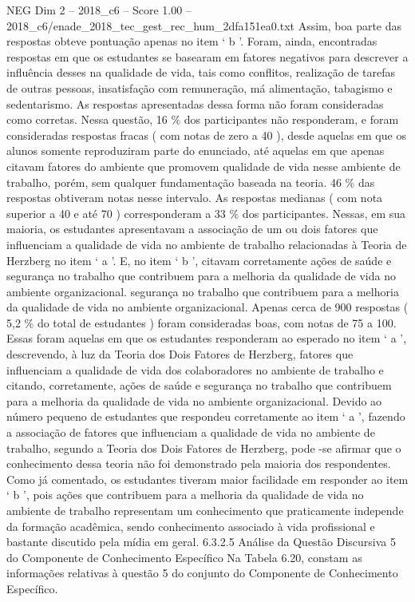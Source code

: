 \begin{textsample}{NEG Dim 2 – 2018\_c6 – Score 1.00 – 2018\_c6/enade\_2018\_tec\_gest\_rec\_hum\_2dfa151ea0.txt}
Assim, boa parte das respostas obteve pontuação apenas no item ‘ b ’.
Foram, ainda, encontradas respostas em que os estudantes se basearam em fatores negativos para descrever a influência desses na qualidade de vida, tais como conflitos, realização de tarefas de outras pessoas, insatisfação com remuneração, má alimentação, tabagismo e sedentarismo.
As respostas apresentadas dessa forma não foram consideradas como corretas.
Nessa questão, 16 \% dos participantes não responderam, e foram consideradas respostas fracas ( com notas de zero a 40 ), desde aquelas em que os alunos somente reproduziram parte do enunciado, até aquelas em que apenas citavam fatores do ambiente que promovem qualidade de vida nesse ambiente de trabalho, porém, sem qualquer fundamentação baseada na teoria. 46 \% das respostas obtiveram notas nesse intervalo.
As respostas medianas ( com nota superior a 40 e até 70 ) corresponderam a 33 \% dos participantes.
Nessas, em sua maioria, os estudantes apresentavam a associação de um ou dois fatores que influenciam a qualidade de vida no ambiente de trabalho relacionadas à Teoria de Herzberg no item ‘ a ’.
E, no item ‘ b ’, citavam corretamente ações de saúde e segurança no trabalho que contribuem para a melhoria da qualidade de vida no ambiente organizacional. segurança no trabalho que contribuem para a melhoria da qualidade de vida no ambiente organizacional.
Apenas cerca de 900 respostas ( 5,2 \% do total de estudantes ) foram consideradas boas, com notas de 75 a 100.
Essas foram aquelas em que os estudantes responderam ao esperado no item ‘ a ’, descrevendo, à luz da Teoria dos Dois Fatores de Herzberg, fatores que influenciam a qualidade de vida dos colaboradores no ambiente de trabalho e citando, corretamente, ações de saúde e segurança no trabalho que contribuem para a melhoria da qualidade de vida no ambiente organizacional.
Devido ao número pequeno de estudantes que respondeu corretamente ao item ‘ a ’, fazendo a associação de fatores que influenciam a qualidade de vida no ambiente de trabalho, segundo a Teoria dos Dois Fatores de Herzberg, pode -se afirmar que o conhecimento dessa teoria não foi demonstrado pela maioria dos respondentes.
Como já comentado, os estudantes tiveram maior facilidade em responder ao item ‘ b ’, pois ações que contribuem para a melhoria da qualidade de vida no ambiente de trabalho representam um conhecimento que praticamente independe da formação acadêmica, sendo conhecimento associado à vida profissional e bastante discutido pela mídia em geral. 6.3.2.5 Análise da Questão Discursiva 5 do Componente de Conhecimento Específico Na Tabela 6.20, constam as informações relativas à questão 5 do conjunto do Componente de Conhecimento Específico.

\end{textsample}
